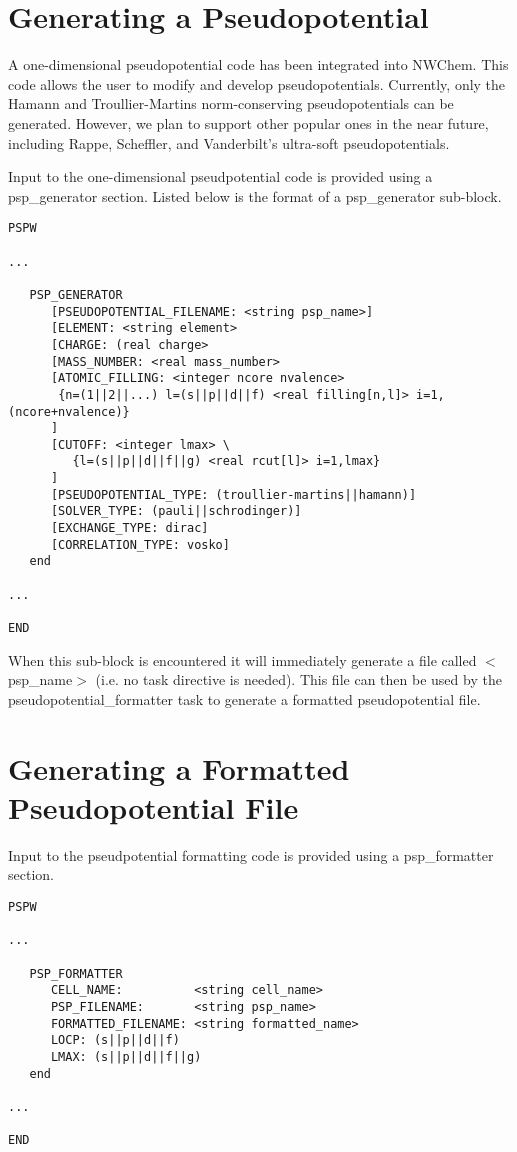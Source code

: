 \section{Generating a Pseudopotential}

A one-dimensional pseudopotential code has been integrated into NWChem.
This code allows the user to modify and develop pseudopotentials.  Currently, 
only the Hamann and Troullier-Martins norm-conserving pseudopotentials can be
generated.  However, we plan to support other popular ones in the near future, 
including Rappe, Scheffler, and Vanderbilt's ultra-soft pseudopotentials.

Input to the one-dimensional pseudpotential code is provided using a
psp\_generator section.  Listed below is the format of a 
psp\_generator sub-block.
\begin{verbatim}
PSPW

...
 
   PSP_GENERATOR
      [PSEUDOPOTENTIAL_FILENAME: <string psp_name>]
      [ELEMENT: <string element>
      [CHARGE: (real charge>
      [MASS_NUMBER: <real mass_number>
      [ATOMIC_FILLING: <integer ncore nvalence>
       {n=(1||2||...) l=(s||p||d||f) <real filling[n,l]> i=1,(ncore+nvalence)}
      ]
      [CUTOFF: <integer lmax> \
         {l=(s||p||d||f||g) <real rcut[l]> i=1,lmax}
      ]
      [PSEUDOPOTENTIAL_TYPE: (troullier-martins||hamann)]
      [SOLVER_TYPE: (pauli||schrodinger)]
      [EXCHANGE_TYPE: dirac]
      [CORRELATION_TYPE: vosko]
   end

... 

END
\end{verbatim}

When this sub-block is encountered it will immediately generate a file called
$<$psp\_name$>$ (i.e. no task directive is needed).  This file can then
be used by the pseudopotential\_formatter task to generate a formatted
pseudopotential file. 


\section{Generating a Formatted Pseudopotential File}
Input to the  pseudpotential formatting code is provided using a
psp\_formatter section. 

\begin{verbatim}
PSPW

... 

   PSP_FORMATTER
      CELL_NAME:          <string cell_name> 
      PSP_FILENAME:       <string psp_name>
      FORMATTED_FILENAME: <string formatted_name>
      LOCP: (s||p||d||f)
      LMAX: (s||p||d||f||g)
   end

...

END
\end{verbatim}

